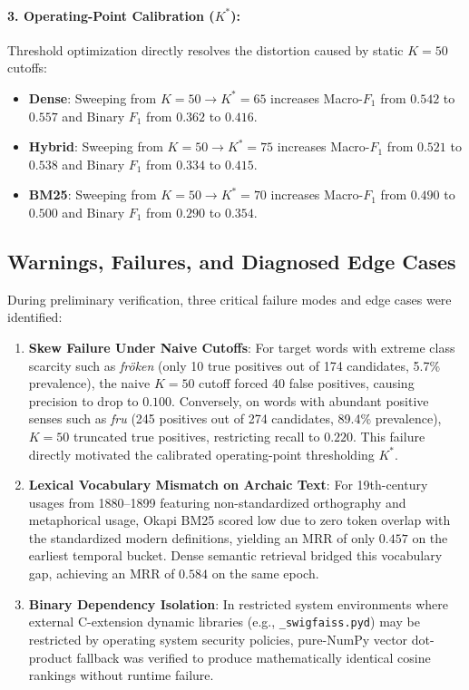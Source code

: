 \paragraph{3. Operating-Point Calibration ($K^*$):}
Threshold optimization directly resolves the distortion caused by static $K=50$ cutoffs:
\begin{itemize}
    \item \textbf{Dense}: Sweeping from $K=50 \to K^*=65$ increases Macro-$F_1$ from $0.542$ to \textbf{$0.557$} and Binary $F_1$ from $0.362$ to \textbf{$0.416$}.
    \item \textbf{Hybrid}: Sweeping from $K=50 \to K^*=75$ increases Macro-$F_1$ from $0.521$ to \textbf{$0.538$} and Binary $F_1$ from $0.334$ to \textbf{$0.415$}.
    \item \textbf{BM25}: Sweeping from $K=50 \to K^*=70$ increases Macro-$F_1$ from $0.490$ to \textbf{$0.500$} and Binary $F_1$ from $0.290$ to \textbf{$0.354$}.
\end{itemize}

\subsection{Warnings, Failures, and Diagnosed Edge Cases}
During preliminary verification, three critical failure modes and edge cases were identified:
\begin{enumerate}
    \item \textbf{Skew Failure Under Naive Cutoffs}: For target words with extreme class scarcity such as \textit{fr\"oken} (only 10 true positives out of 174 candidates, 5.7\% prevalence), the naive $K=50$ cutoff forced 40 false positives, causing precision to drop to $0.100$. Conversely, on words with abundant positive senses such as \textit{fru} (245 positives out of 274 candidates, 89.4\% prevalence), $K=50$ truncated true positives, restricting recall to $0.220$. This failure directly motivated the calibrated operating-point thresholding $K^*$.
    \item \textbf{Lexical Vocabulary Mismatch on Archaic Text}: For 19th-century usages from 1880--1899 featuring non-standardized orthography and metaphorical usage, Okapi BM25 scored low due to zero token overlap with the standardized modern definitions, yielding an MRR of only $0.457$ on the earliest temporal bucket. Dense semantic retrieval bridged this vocabulary gap, achieving an MRR of $0.584$ on the same epoch.
    \item \textbf{Binary Dependency Isolation}: In restricted system environments where external C-extension dynamic libraries (e.g., \texttt{\_swigfaiss.pyd}) may be restricted by operating system security policies, pure-NumPy vector dot-product fallback was verified to produce mathematically identical cosine rankings without runtime failure.
\end{enumerate}

